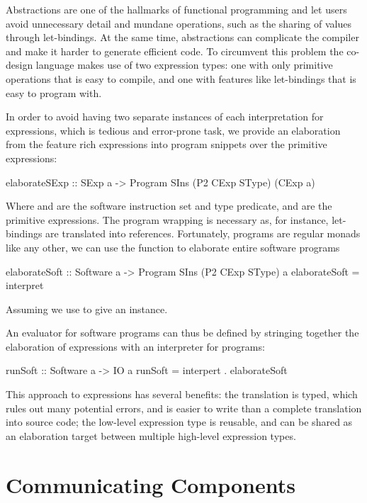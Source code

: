 \documentclass[../main.tex]{subfiles}
\begin{document}
Abstractions are one of the hallmarks of functional programming and let users avoid unnecessary detail and mundane operations, such as the sharing of values through let-bindings. At the same time, abstractions can complicate the compiler and make it harder to generate efficient code. To circumvent this problem the co-design language makes use of two expression types: one with only primitive operations that is easy to compile, and one with features like let-bindings that is easy to program with.

In order to avoid having two separate instances of each interpretation for expressions, which is tedious and error-prone task, we provide an elaboration from the feature rich expressions into program snippets over the primitive expressions:

\begin{code}
elaborateSExp :: SExp a -> Program SIns (P2 CExp SType) (CExp a)
\end{code}

\noindent Where  and  are the software instruction set and type predicate, and  are the primitive expressions. The program wrapping is necessary as, for instance, let-bindings are translated into references. Fortunately, programs are regular monads like any other, we can use the  function to elaborate entire software programs

\begin{code}
elaborateSoft :: Software a -> Program SIns (P2 CExp SType) a
elaborateSoft = interpret
\end{code}

\noindent Assuming we use  to give an  instance.

An evaluator for software programs can thus be defined by stringing together the elaboration of expressions with an interpreter for programs:

\begin{code}
runSoft :: Software a -> IO a
runSoft = interpert . elaborateSoft
\end{code}

This approach to expressions has several benefits: the translation is typed, which rules out many potential errors, and is easier to write than a complete translation into source code; the low-level expression type is reusable, and can be shared as an elaboration target between multiple high-level expression types.

\section{Communicating Components}
\end{document}
